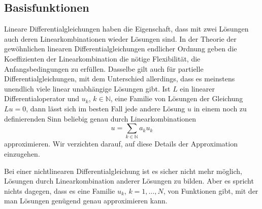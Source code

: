 \subsection{Basisfunktionen}
Lineare Differentialgleichungen haben die Eigenschaft, dass 
mit zwei Lösungen auch deren Linear\-kombinationen wieder Lösungen sind.
In der Theorie der gewöhnlichen linearen Differentialgleichungen endlicher
Ordnung geben die Koeffizienten der Linearkombination die nötige Flexibilität,
die Anfangsbedingungen zu erfüllen.
Dasselbe gilt auch für partielle Differentialgleichungen, mit dem Unterschied
allerdings, dass es meinstens unendlich viele linear unabhängige Lösungen
gibt.
Ist $L$ ein linearer Differentialoperator und $u_k$, $k\in\mathbb N$, eine
Familie von Lösungen der Gleichung $Lu=0$,
dann lässt sich im besten Fall jede andere Lösung $u$ in einem noch
zu definierenden Sinn beliebig genau durch Linearkombinationen
\[
u=\sum_{k\in\mathbb N} a_ku_k
\]
approximieren.
Wir verzichten darauf, auf diese Details der Approximation einzugehen.

Bei einer nichtlinearen Differentialgleichung ist es sicher nicht
mehr möglich, Lösungen durch Linearkombination anderer Lösungen
zu bilden.
Aber es spricht nichts dagegen, dass es eine Familie $u_k$, $k=1,\dots,N$,
von Funktionen gibt, mit der man Lösungen genügend genau approximieren
kann.

